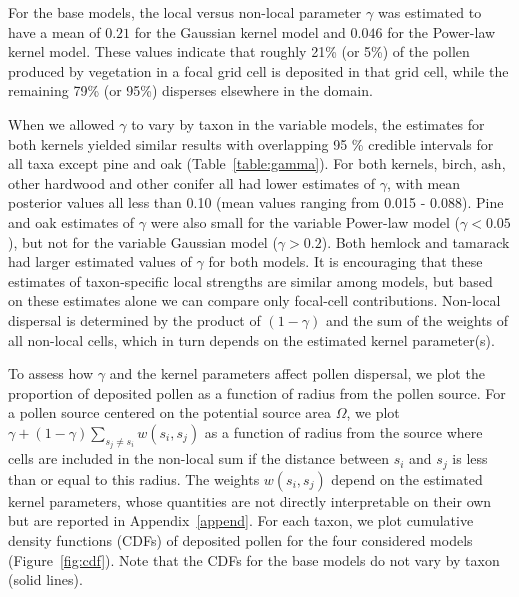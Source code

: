 \documentclass[12pt]{article}
\begin{document}

For the base models, the local versus non-local parameter $\gamma$ was
estimated to have a mean of $0.21$ for the Gaussian kernel model and
$0.046$ for the Power-law kernel model. These values indicate that
roughly 21\% (or 5\%) of the pollen produced by vegetation in a focal
grid cell is deposited in that grid cell, while the remaining 79\% (or
95\%) disperses elsewhere in the domain.

When we allowed $\gamma$ to vary by taxon in the variable models, the
estimates for both kernels yielded similar results with overlapping 95
\% credible intervals for all taxa except pine and oak
(Table~\ref{table:gamma}). For both kernels, birch, ash, other
hardwood and other conifer all had lower estimates of $\gamma$, with
mean posterior values all less than 0.10 (mean values ranging from
0.015 - 0.088). Pine and oak estimates of $\gamma$ were also small for
the variable Power-law model ($\gamma < 0.05$), but not for the
variable Gaussian model ($\gamma > 0.2$). Both hemlock and tamarack
had larger estimated values of $\gamma$ for both models. It is
encouraging that these estimates of taxon-specific local strengths are
similar among models, but based on these estimates alone we can
compare only focal-cell contributions. Non-local dispersal is
determined by the product of $(1-\gamma)$ and the sum of the weights
of all non-local cells, which in turn depends on the estimated kernel
parameter(s).


To assess how $\gamma$ and the kernel parameters affect pollen
dispersal, we plot the proportion of deposited pollen as a function of
radius from the pollen source. For a pollen source centered on the
potential source area $\Omega$, we plot $\gamma + (1- \gamma)
\sum_{s_j \neq s_i} w(s_i, s_j)$ as a function of radius from the
source where cells are included in the non-local sum if the distance
between $s_i$ and $s_j$ is less than or equal to this radius. The
weights $w(s_i, s_j)$ depend on the estimated kernel parameters, whose
quantities are not directly interpretable on their own but are
reported in Appendix~\ref{append}. For each taxon, we plot cumulative
density functions (CDFs) of deposited pollen for the four considered
models (Figure~\ref{fig:cdf}). Note that the CDFs for the base models
do not vary by taxon (solid lines).
\end{document}
